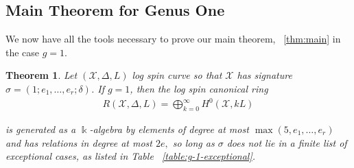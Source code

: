 \documentclass{amsart}
\theoremstyle{plain}
\newtheorem{thm}{Theorem}[section]
\theoremstyle{definition}
\newtheorem{example}[thm]{Example}
\theoremstyle{remark}
\numberwithin{equation}{section}
\newcommand\ssec{\subsection}
\newcommand\Bk{{\Bbbk}}
\DeclareMathOperator\di{Div}
\newcommand\sx{\mathscr X}
\newcommand{\halfcan}{L}
\begin{document}
%
%
%


\ssec{Main Theorem for Genus One}
\label{ssec:main_g_1}

We now have all the tools necessary to prove our main theorem, ~\ref{thm:main} in the case $g = 1$. 

\begin{thm}
\label{thm:g-1-main}
Let $(\sx, \Delta, \halfcan)$ log spin curve so that $\sx$ has signature $\sigma = (1; e_1, \ldots, e_r; \delta)$.
If $g = 1$, then the log spin canonical ring
\begin{align*}
	R(\sx, \Delta, \halfcan) = \bigoplus_{k = 0}^\infty H^0(\sx, k L)
\end{align*}

\noindent
is generated as a $\Bk$-algebra by elements of degree at most $\max(5, e_1, \ldots, e_r)$ and has relations in degree at most $2e,$ so long as $\sigma$ does not lie in a
finite list of exceptional cases, as listed in Table
~\ref{table:g-1-exceptional}.
\end{thm}
\end{document}
